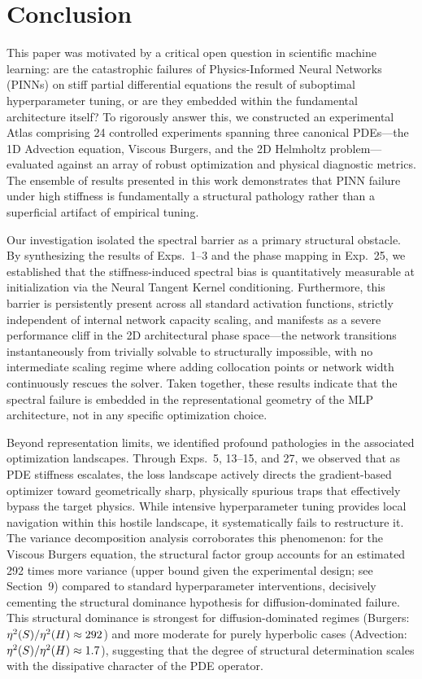 \section{Conclusion}\label{sec:conclusion}

This paper was motivated by a critical open question in scientific machine learning: are the catastrophic failures of Physics-Informed Neural Networks (PINNs) on stiff partial differential equations the result of suboptimal hyperparameter tuning, or are they embedded within the fundamental architecture itself? To rigorously answer this, we constructed an experimental Atlas comprising 24 controlled experiments spanning three canonical PDEs—the 1D Advection equation, Viscous Burgers, and the 2D Helmholtz problem—evaluated against an array of robust optimization and physical diagnostic metrics. The ensemble of results presented in this work demonstrates that PINN failure under high stiffness is fundamentally a structural pathology rather than a superficial artifact of empirical tuning.

Our investigation isolated the spectral barrier as a primary structural obstacle. By synthesizing the results of Exps.~1–3 and the phase mapping in Exp.~25, we established that the stiffness-induced spectral bias is quantitatively measurable at initialization via the Neural Tangent Kernel conditioning. Furthermore, this barrier is persistently present across all standard activation functions, strictly independent of internal network capacity scaling, and manifests as a severe performance cliff in the 2D architectural phase space—the network transitions instantaneously from trivially solvable to structurally impossible, with no intermediate scaling regime where adding collocation points or network width continuously rescues the solver. Taken together, these results indicate that the spectral failure is embedded in the representational geometry of the MLP architecture, not in any specific optimization choice.

Beyond representation limits, we identified profound pathologies in the associated optimization landscapes. Through Exps.~5, 13–15, and 27, we observed that as PDE stiffness escalates, the loss landscape actively directs the gradient-based optimizer toward geometrically sharp, physically spurious traps that effectively bypass the target physics. While intensive hyperparameter tuning provides local navigation within this hostile landscape, it systematically fails to restructure it. The variance decomposition analysis corroborates this phenomenon: for the Viscous Burgers equation, the structural factor group accounts for an estimated 292 times more variance (upper bound given the experimental design; see Section~9) compared to standard hyperparameter interventions, decisively cementing the structural dominance hypothesis for diffusion-dominated failure. This structural dominance is strongest for diffusion-dominated regimes (Burgers: $\eta^2{}(S)/\eta^2{}(H) \approx 292$) and more moderate for purely hyperbolic cases (Advection: $\eta^2{}(S)/\eta^2{}(H) \approx 1.7$), suggesting that the degree of structural determination scales with the dissipative character of the PDE operator.

